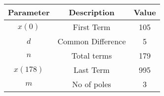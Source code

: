 \begin{tabular}{|c|c|c|}
    \hline
     Parameter & Description & Value \\
    \hline
     $x(0)$ & First Term & 105\\
     \hline
     $d$ & Common Difference & 5\\
    \hline
    $n$ & Total terms & 179 \\ 
    \hline
    $x(178)$ & Last Term & 995\\
    \hline
    $m$ & No of poles & 3\\
    \hline
\end{tabular}
